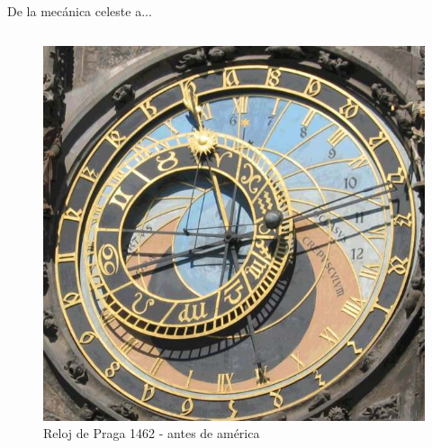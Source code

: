 \documentclass{beamer}
\begin{document}
\begin{frame}{De la mecánica celeste a...}
\transfade
    \begin{columns}
    \begin{column}{0.5\textwidth}
        \begin{figure}
            \centering
            \includegraphics[width=1\linewidth]{reloj.jpg}
            \caption{Reloj de Praga 1462 - antes de américa}
            \label{fig:my_label}
        \end{figure}
    \end{column}
    \pause
    

\end{columns}
\end{frame}
\end{document}
